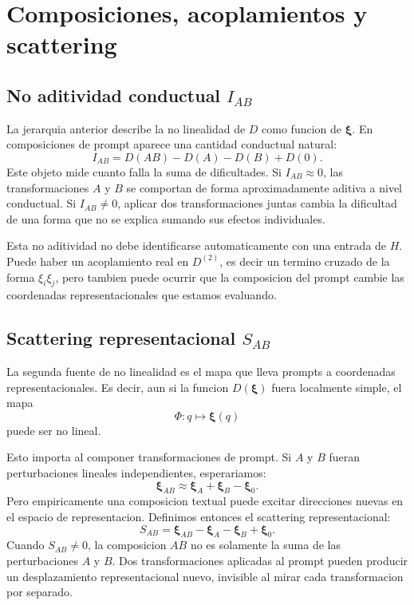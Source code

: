 ﻿\documentclass[10pt,twocolumn]{article}
\newcommand{\xrep}{\bm{\xi}}
\begin{document}
\section{Composiciones, acoplamientos y scattering}

\subsection{No aditividad conductual \texorpdfstring{\(I_{AB}\)}{IAB}}

La jerarquia anterior describe la no linealidad de \(D\) como funcion de \(\xrep\). En composiciones de prompt aparece una cantidad conductual natural:
\[
I_{AB}
=
D(AB)-D(A)-D(B)+D(0).
\]
Este objeto mide cuanto falla la suma de dificultades. Si \(I_{AB}\approx0\), las transformaciones \(A\) y \(B\) se comportan de forma aproximadamente aditiva a nivel conductual. Si \(I_{AB}\neq0\), aplicar dos transformaciones juntas cambia la dificultad de una forma que no se explica sumando sus efectos individuales.

Esta no aditividad no debe identificarse automaticamente con una entrada de \(H\). Puede haber un acoplamiento real en \(D^{(2)}\), es decir un termino cruzado de la forma \(\xi_i\xi_j\), pero tambien puede ocurrir que la composicion del prompt cambie las coordenadas representacionales que estamos evaluando.

\subsection{Scattering representacional \texorpdfstring{\(S_{AB}\)}{SAB}}

La segunda fuente de no linealidad es el mapa que lleva prompts a coordenadas representacionales. Es decir, aun si la funcion \(D(\xrep)\) fuera localmente simple, el mapa
\[
\Phi:q\longmapsto\xrep(q)
\]
puede ser no lineal.

Esto importa al componer transformaciones de prompt. Si \(A\) y \(B\) fueran perturbaciones lineales independientes, esperariamos:
\[
\xrep_{AB}
\approx
\xrep_A+\xrep_B-\xrep_0.
\]
Pero empiricamente una composicion textual puede excitar direcciones nuevas en el espacio de representacion. Definimos entonces el scattering representacional:
\[
S_{AB}
=
\xrep_{AB}
-\xrep_A
-\xrep_B
+\xrep_0.
\]
Cuando \(S_{AB}\neq0\), la composicion \(AB\) no es solamente la suma de las perturbaciones \(A\) y \(B\). Dos transformaciones aplicadas al prompt pueden producir un desplazamiento representacional nuevo, invisible al mirar cada transformacion por separado.
\end{document}
